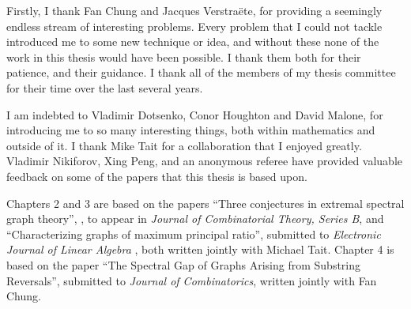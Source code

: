 \begin{frontmatter}
%
\tableofcontents
\listoffigures  %



%
%
\begin{acknowledgements}

Firstly, I thank Fan Chung and Jacques Verstra\"{e}te, for providing a seemingly endless
stream of interesting problems.  Every problem that I could not tackle introduced me
to some new technique or idea, and without these none of the work in this thesis would have
been possible.  I thank them both for their patience, and their guidance.  I thank all
of the members of my thesis committee for their time over the last several years.


I am indebted to Vladimir Dotsenko, Conor Houghton and David Malone, for introducing me
to so many interesting things, both within mathematics and outside of it.
I thank Mike Tait for a collaboration that I enjoyed greatly.
Vladimir Nikiforov, Xing Peng, and an anonymous referee have provided
valuable feedback on some of the papers that this thesis is based upon.



Chapters 2 and 3 are based on the papers ``Three conjectures in extremal spectral graph theory'',
 \cite{TaitTobin2017}, to appear in \textit{Journal of Combinatorial Theory, Series B},
 and ``Characterizing graphs of maximum principal ratio'', submitted to
 \textit{Electronic Journal of Linear Algebra} \cite{TaitTobin2015},
 both written jointly with Michael Tait.
Chapter 4 is based on the paper ``The Spectral Gap of Graphs Arising from Substring Reversals'',
submitted to \textit{Journal of Combinatorics}, written jointly with Fan Chung.

\end{acknowledgements}



\end{frontmatter}
